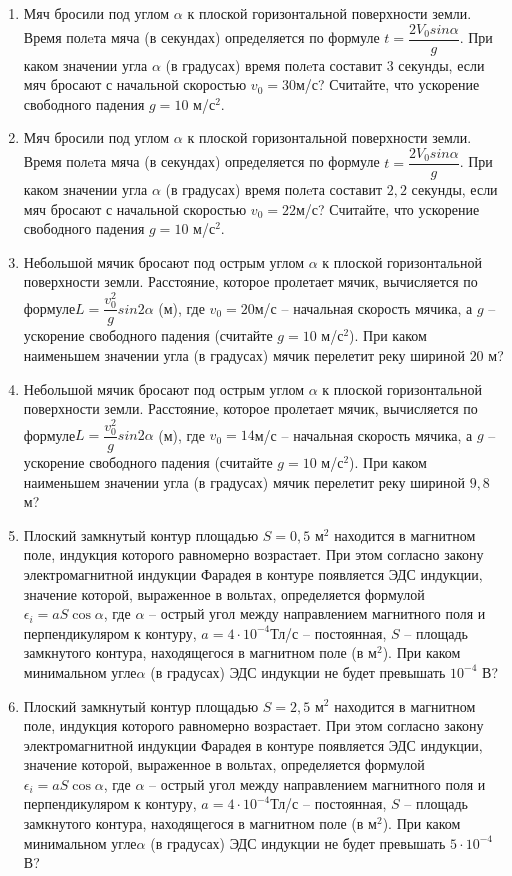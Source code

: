 \documentclass[12pt, a4paper]{article}
\begin{document}
\begin{enumerate}
		\item Мяч бросили под углом \( \alpha \) к плоской горизонтальной поверхности земли. Время полeта мяча (в секундах) определяется по формуле \( t=\dfrac{2V_0sin\alpha}{g} \). При каком значении угла \( \alpha \) (в градусах) время полeта составит \( 3 \) секунды, если мяч бросают с начальной скоростью \( v_0=30 \)м/с? Считайте, что ускорение свободного падения \( g=10 \) м/с\( ^2 \).
		\item Мяч бросили под углом \( \alpha \) к плоской горизонтальной поверхности земли. Время полeта мяча (в секундах) определяется по формуле \( t=\dfrac{2V_0sin\alpha}{g} \). При каком значении угла \( \alpha \) (в градусах) время полeта составит \( 2,2 \) секунды, если мяч бросают с начальной скоростью \( v_0=22 \)м/с? Считайте, что ускорение свободного падения \( g=10 \) м/с\( ^2 \).
		\item Небольшой мячик бросают под острым углом \( \alpha \) к плоской горизонтальной поверхности земли. Расстояние, которое пролетает мячик, вычисляется по формуле\( L=\dfrac{v_0 ^2}{g} sin2\alpha\) (м), где \( v_0=20 \)м/с – начальная скорость мячика, а \(g\) – ускорение свободного падения (считайте \(  g=10 \) м/с\( ^2 \)). При каком наименьшем значении угла (в градусах) мячик перелетит реку шириной \( 20 \) м?
		\item Небольшой мячик бросают под острым углом \( \alpha \) к плоской горизонтальной поверхности земли. Расстояние, которое пролетает мячик, вычисляется по формуле\( L=\dfrac{v_0 ^2}{g} sin2\alpha\) (м), где \( v_0=14 \)м/с – начальная скорость мячика, а \(g\) – ускорение свободного падения (считайте \(  g=10 \) м/с\( ^2 \)). При каком наименьшем значении угла (в градусах) мячик перелетит реку шириной \( 9,8 \) м?
		\item Плоский замкнутый контур площадью \( S = 0,5 \) м\( ^2 \) находится в магнитном поле, индукция которого равномерно возрастает. При этом согласно закону электромагнитной индукции Фарадея в контуре появляется ЭДС индукции, значение которой, выраженное в вольтах, определяется формулой \( \epsilon _i = aS\cos \alpha \), где  \( \alpha \) – острый угол между направлением магнитного поля и перпендикуляром к контуру, \(  a=4\cdot10^{-4}\)Тл/с – постоянная, \( S \) – площадь замкнутого контура, находящегося в магнитном поле (в м\( ^2 \)). При каком минимальном угле\( \alpha \) (в градусах) ЭДС индукции не будет превышать \( 10^{-4} \) В?
		\item Плоский замкнутый контур площадью \( S = 2,5 \) м\( ^2 \) находится в магнитном поле, индукция которого равномерно возрастает. При этом согласно закону электромагнитной индукции Фарадея в контуре появляется ЭДС индукции, значение которой, выраженное в вольтах, определяется формулой \( \epsilon _i = aS\cos \alpha \), где  \( \alpha \) – острый угол между направлением магнитного поля и перпендикуляром к контуру, \(  a=4\cdot10^{-4}\)Тл/с – постоянная, \( S \) – площадь замкнутого контура, находящегося в магнитном поле (в м\( ^2 \)). При каком минимальном угле\( \alpha \) (в градусах) ЭДС индукции не будет превышать \( 5\cdot 10^{-4} \)В?

\end{enumerate}
\end{document}
